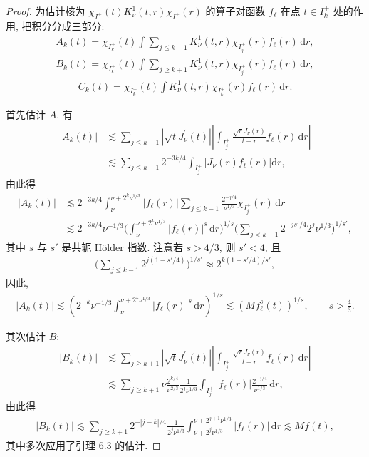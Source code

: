 \begin{proof}
为估计核为 $\chi_{I^{+}}(t)K_{\nu}^{1}(t,r)\chi_{I^{+}}(r)$ 的算子对函数 $f_{\ell}$ 在点 $t \in I_{k}^{+}$ 处的作用, 把积分分成三部分:
\begin{align*}
  A_{k}(t)=\chi_{I_{k}^{+}}(t)\int\sum_{j\leq k-1}K_{\nu}^{1}(t,r)\chi_{I_{j}^{+}}(r)f_{\ell}(r)\,\mathrm{d}r,
\end{align*}
\begin{align*}
  B_{k}(t)=\chi_{I_{k}^{+}}(t)\int\sum_{j\geq k+1}K_{\nu}^{1}(t,r)\chi_{I_{j}^{+}}(r)f_{\ell}(r)\,\mathrm{d}r,
\end{align*}
\begin{align*}
  C_{k}(t)=\chi_{I_{k}^{+}}(t)\int K_{\nu}^{1}(t,r)\chi_{I_{k}^{+}}(r)f_{\ell}(r)\,\mathrm{d}r.
\end{align*}

首先估计 $A$. 有
\begin{align*}
  \left|A_{k}(t)\right|
  &\lesssim\sum_{j\leq k-1}\left|\sqrt{t}J_{\nu}^{\prime}(t)\right|\left|\int_{I_{j}^{+}}\frac{\sqrt{r}J_{\nu}(r)}{t-r}f_{\ell}(r)\,\mathrm{d}r\right|\\
  &\lesssim\sum_{j\leq k-1}2^{-3k/4}\int_{I_{j}^{+}}\left|J_{\nu}(r)f_{\ell}(r)\right|\mathrm{d}r,
\end{align*}
由此得
\begin{align*}
  \left|A_{k}(t)\right|
  &\lesssim 2^{-3k/4}\int_{\nu}^{\nu+2^{k}\nu^{1/3}}\left|f_{\ell}(r)\right|\sum_{j\leq k-1}\frac{2^{-j/4}}{\nu^{1/3}}\chi_{I_{j}^{+}}(r)\,\mathrm{d}r\\
  &\lesssim 2^{-3k/4}\nu^{-1/3}\Big(\int_{\nu}^{\nu+2^{k}\nu^{1/3}}\left|f_{\ell}(r)\right|^{s}\,\mathrm{d}r\Big)^{1/s}
   \Big(\sum_{j<k-1}2^{-js'/4}2^{j}\nu^{1/3}\Big)^{1/s'},
\end{align*}
其中 $s$ 与 $s'$ 是共轭 Hölder 指数. 注意若 $s > 4/3$, 则 $s' < 4$, 且
\begin{align*}
  \Big(\sum_{j\leq k-1}2^{j(1-s'/4)}\Big)^{1/s'}\approx 2^{k(1-s'/4)/s'},
\end{align*}
因此,
\begin{align*}
  |A_{k}(t)|\lesssim\left(2^{-k}\nu^{-1/3}\int_{\nu}^{\nu+2^{k}\nu^{1/3}}|f_{\ell}(r)|^{s}\,\mathrm{d}r\right)^{1/s}
  \lesssim\left(M f_{\ell}^{s}(t)\right)^{1/s},\qquad s>\frac{4}{3}.
\end{align*}

其次估计 $B$:
\begin{align*}
  \left|B_{k}(t)\right|
  &\lesssim\sum_{j\geq k+1}\left|\sqrt{t}J_{\nu}^{\prime}(t)\right|\left|\int_{I_{j}^{+}}\frac{\sqrt{r}J_{\nu}(r)}{t-r}f_{\ell}(r)\,\mathrm{d}r\right|\\
  &\lesssim\sum_{j\geq k+1}\nu\frac{2^{k/4}}{\nu^{2/3}}\frac{1}{2^{j}\nu^{1/3}}\int_{I_{j}^{+}}\left|f_{\ell}(r)\right|\frac{2^{-j/4}}{\nu^{1/3}}\,\mathrm{d}r,
\end{align*}
由此得
\begin{align*}
  |B_{k}(t)|\lesssim\sum_{j\geq k+1}2^{-|j-k|/4}\frac{1}{2^{j}\nu^{1/3}}
  \int_{\nu+2^{j}\nu^{1/3}}^{\nu+2^{j+1}\nu^{1/3}}|f_{\ell}(r)|\,\mathrm{d}r
  \lesssim M f(t),
\end{align*}
其中多次应用了引理 6.3 的估计.


\end{proof}
